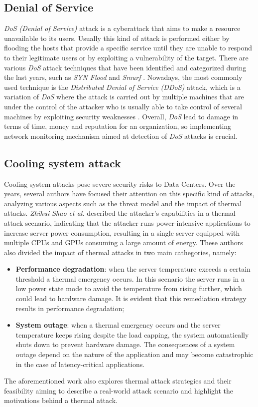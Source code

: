 \subsection{Denial of Service}
\emph{DoS (Denial of Service)} attack is a cyberattack that aims to make a resource unavailable to its users. Usually this kind of attack is performed either by flooding the hosts that provide a specific service until they are unable to respond to their legitimate users or by exploiting a vulnerability of the target. There are various \emph{DoS} attack techniques that have been identified and categorized during the last years, such as \emph{SYN Flood} and \emph{Smurf} \cite{understandingdos}. Nowadays, the most commonly used technique is the \emph{Distributed Denial of Service (DDoS)} attack, which is a variation of \emph{DoS} where the attack is carried out by multiple machines that are under the control of the attacker who is usually able to take control of several machines by exploiting security weaknesses \cite{understandingdos}. Overall, \emph{DoS} lead to damage in terms of time, money and reputation for an organization, so implementing network monitoring mechanism aimed at detection of \emph{DoS} attacks is crucial. 
\subsection{Cooling system attack}
Cooling system attacks pose severe security risks to Data Centers. Over the years, several authors have focused their attention on this specific kind of attacks, analyzing various aspects such as the threat model and the impact of thermal attacks. \emph{Zhihui Shao et al.} \cite{hiddenthreatthermalattacks} described the attacker's capabilities in a thermal attack scenario, indicating that the attacker runs power-intensive applications to increase server power consumption, resulting in a single server equipped with multiple CPUs and GPUs consuming a large amount of energy. These authors also divided the impact of thermal attacks in two main cathegories, namely:
\begin{itemize}
    \item \textbf{Performance degradation}: when the server temperature exceeds a certain threshold a thermal emergency occurs. In this scenario the server runs in a low power state mode to avoid the temperature from rising further, which could lead to hardware damage. It is evident that this remediation strategy results in performance degradation; 
    \item \textbf{System outage}: when a thermal emergency occurs and the server temperature keeps rising despite the load capping, the system automatically shuts down to prevent hardware damage. The consequences of a system outage depend on the nature of the application and may become catastrophic in the case of latency-critical applications.
\end{itemize}
The aforementioned work also explores thermal attack strategies and their feasibility aiming to describe a real-world attack scenario and highlight the motivations behind a thermal attack. 

